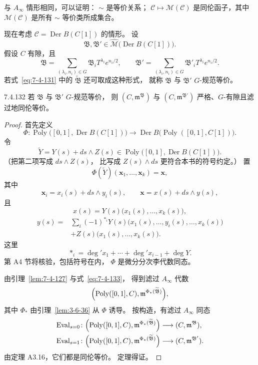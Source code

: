 与 $A_\infty$ 情形相同，可以证明：
$\sim$ 是等价关系；
$\mathcal C\mapsto\mathcal M(\mathcal C)$
是同伦函子，其中
$\mathcal M(\mathcal C)$
是所有 $\sim$ 等价类所成集合。

现在考虑
$\mathcal C=\operatorname{Der}B(C[1])$ 的情形。
设
\[
\mathfrak B,\mathfrak B'
\in
\widehat{\mathcal M}
\bigl(\operatorname{Der}B(C[1])\bigr).
\]
假设 $C$ 有隙，且
\[
\mathfrak B
=\sum_{(\lambda_i,n_i)\in G}
\mathfrak B_iT^{\lambda_i}e^{n_i/2},
\qquad
\mathfrak B'
=\sum_{(\lambda_i,n_i)\in G}
\mathfrak B'_iT^{\lambda_i}e^{n_i/2}.
\]
若式~\eqref{eq:7-4-131} 中的
$\widetilde{\mathfrak B}$
还可取成这种形式，
就称 $\mathfrak B$ 与 $\mathfrak B'$
$G$-规范等价。

\begin{theorem}{7.4.132}\label{thm:7-4-132}
若 $\mathfrak B$ 与 $\mathfrak B'$
$G$-规范等价，
则 $(C,\mathfrak m^{\mathfrak B})$
与 $(C,\mathfrak m^{\mathfrak B'})$
严格、$G$-有隙且滤过地同伦等价。
\end{theorem}

\begin{proof}
首先定义
\begin{equation}
\Phi\colon
\operatorname{Poly}
\bigl([0,1],\operatorname{Der}B(C[1])\bigr)
\longrightarrow
\operatorname{Der}B
\bigl(\operatorname{Poly}([0,1],C[1])\bigr).
\tag{7.4.133}\label{eq:7-4-133}
\end{equation}
令
\[
\widetilde Y
=Y(s)+ds\wedge Z(s)
\in
\operatorname{Poly}
\bigl([0,1],\operatorname{Der}B(C[1])\bigr).
\]
（把第二项写成 $ds\wedge Z(s)$，
比写成 $Z(s)\wedge ds$ 更符合本书的符号约定。）
置
\[
\Phi(\widetilde Y)
(\mathbf x_1,\ldots,\mathbf x_k)
=\mathbf x,
\]
其中
\[
\mathbf x_i=x_i(s)+ds\wedge y_i(s),
\qquad
\mathbf x=x(s)+ds\wedge y(s),
\]
且
\[
x(s)=Y(s)
\bigl(x_1(s),\ldots,x_k(s)\bigr),
\]
\[
\begin{aligned}
y(s)={}&
\sum_i(-1)^{*_i}Y(s)
\bigl(x_1(s),\ldots,y_i(s),\ldots,x_k(s)\bigr)\\
&+Z(s)\bigl(x_1(s),\ldots,x_k(s)\bigr).
\end{aligned}
\]
这里
\[
*_i=\deg' x_1+\cdots+\deg' x_{i-1}+\deg Y.
\]
第 A4 节将核验，包括符号在内，
$\Phi$ 是微分分次李代数同态。

由引理~\ref{lem:7-4-127} 与式~\eqref{eq:7-4-133}，
得到滤过 $A_\infty$ 代数
\[
\Bigl(
\operatorname{Poly}([0,1],C),
\mathfrak m^{\Phi_*(\widetilde{\mathfrak B})}
\Bigr),
\]
其中 $\Phi_*$ 由引理~\ref{lem:3-6-36}
从 $\Phi$ 诱导。
按构造，有滤过 $A_\infty$ 同态
\[
\begin{aligned}
\operatorname{Eval}_{s=0}\colon
\Bigl(\operatorname{Poly}([0,1],C),
\mathfrak m^{\Phi_*(\widetilde{\mathfrak B})}\Bigr)
&\longrightarrow(C,\mathfrak m^{\mathfrak B}),\\
\operatorname{Eval}_{s=1}\colon
\Bigl(\operatorname{Poly}([0,1],C),
\mathfrak m^{\Phi_*(\widetilde{\mathfrak B})}\Bigr)
&\longrightarrow(C,\mathfrak m^{\mathfrak B'}).
\end{aligned}
\]
由定理 A3.16，它们都是同伦等价。
定理得证。
\end{proof}

